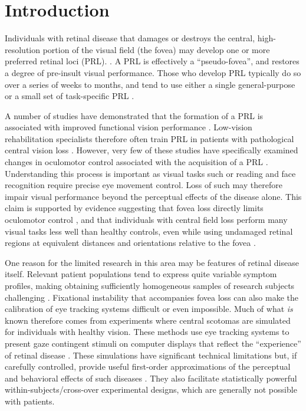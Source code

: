 \chapter{Introduction}
\label{introduction}

Individuals with retinal disease that damages or destroys the central, high-resolution portion of the visual field (the fovea) may develop one or more preferred retinal loci (PRL). \citep{vonnoorden_1962,whittaker_1988,fletcher_1997,white_1990,whittaker_1991}. A PRL is effectively a ``pseudo-fovea'', and restores a degree of pre-insult visual performance. Those who develop PRL typically do so over a series of weeks to months, and tend to use either a single general-purpose \citep{vonnoorden_1962,whittaker_1988,fletcher_1997} or a small set of task-specific PRL \citep{timberlake_1986}.

A number of studies have demonstrated that the formation of a PRL is associated with improved functional vision performance \citep{palmer_2010,crossland_2004,seiple_2005}. Low-vision rehabilitation specialists therefore often train PRL in patients with pathological central vision loss \citep{schuchard_2005,watson_2006}. However, very few of these studies have specifically examined changes in oculomotor control associated with the acquisition of a PRL \citep{crossland_2004}. Understanding this process is important as visual tasks such or reading and face recognition require precise eye movement control. Loss of such may therefore  impair visual performance beyond the perceptual effects of the disease alone. This claim is supported by evidence suggesting that fovea loss directly limits oculomotor control \citep{schuchard_2005,crossland_2004,bullimore_1995}, and that individuals with central field loss perform many visual tasks less well than healthy controls, even while using undamaged retinal regions at equivalent distances and orientations relative to the fovea \citep{timberlake_1986,mcmahon_1991,mcmahon_1993}.

One reason for the limited research in this area may be features of retinal disease itself. Relevant patient populations tend to express quite variable symptom profiles, making obtaining sufficiently homogeneous samples of research subjects challenging \citep{bowers_1997}. Fixational instability that accompanies fovea loss can also make the calibration of eye tracking systems difficult or even impossible. Much of what \textit{is} known therefore comes from experiments where central scotomas are simulated for individuals with healthy vision. These methods use eye tracking systems to present gaze contingent stimuli on computer displays that reflect the ``experience'' of retinal disease \citep{mcilreavy_2012,aguilar_2011}. These simulations have significant technical limitations but, if carefully controlled, provide useful first-order approximations of the perceptual and behavioral effects of such diseases \citep{bowers_1997}. They also facilitate statistically powerful within-subjects/cross-over experimental designs, which are generally not possible with patients.

